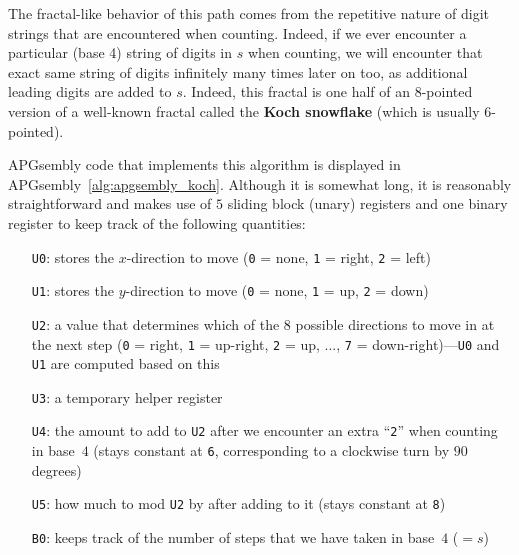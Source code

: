 The fractal-like behavior of this path comes from the repetitive nature of digit strings that are encountered when counting. Indeed, if we ever encounter a particular (base 4) string of digits in $s$ when counting, we will encounter that exact same string of digits infinitely many times later on too, as additional leading digits are added to $s$. Indeed, this fractal is one half of an $8$-pointed version of a well-known fractal called the \textbf{Koch snowflake} (which is usually $6$-pointed).

APGsembly code that implements this algorithm is displayed in APGsembly~\ref{alg:apgsembly_koch}. Although it is somewhat long, it is reasonably straightforward and makes use of $5$ sliding block (unary) registers and one binary register to keep track of the following quantities:\smallskip

\begin{itemize}
	\item[\texttt{U0}:] stores the $x$-direction to move (\texttt{0} = none, \texttt{1} = right, \texttt{2} = left)
	
	\item[\texttt{U1}:] stores the $y$-direction to move (\texttt{0} = none, \texttt{1} = up, \texttt{2} = down)
	
	\item[\texttt{U2}:] a value that determines which of the 8 possible directions to move in at the next step (\texttt{0} = right, \texttt{1} = up-right, \texttt{2} = up, ..., \texttt{7} = down-right)---\texttt{U0} and \texttt{U1} are computed based on this
	
	\item[\texttt{U3}:] a temporary helper register
	
	\item[\texttt{U4}:] the amount to add to \texttt{U2} after we encounter an extra ``\texttt{2}'' when counting in base~$4$ (stays constant at \texttt{6}, corresponding to a clockwise turn by $90$ degrees)
	
	\item[\texttt{U5}:] how much to mod \texttt{U2} by after adding to it (stays constant at \texttt{8})\smallskip
	
	\item[\texttt{B0}:] keeps track of the number of steps that we have taken in base~$4$ ($= s$)\smallskip
\end{itemize}

